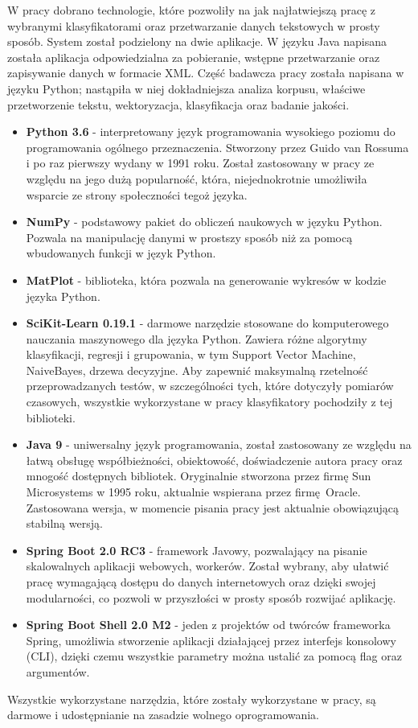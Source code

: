 W pracy dobrano technologie, które pozwoliły na jak najłatwiejszą pracę z wybranymi klasyfikatorami oraz przetwarzanie danych tekstowych w prosty sposób. System został podzielony na dwie aplikacje. W języku Java napisana została aplikacja odpowiedzialna za pobieranie, wstępne przetwarzanie oraz zapisywanie danych w formacie XML. Część badawcza pracy została napisana w języku Python; nastąpiła w niej dokładniejsza analiza korpusu, właściwe przetworzenie tekstu, wektoryzacja, klasyfikacja oraz badanie jakości. 
\begin{itemize}
\setlength\itemsep{0.6em}
\item \textbf{Python 3.6} - interpretowany język programowania wysokiego poziomu do programowania ogólnego przeznaczenia.\cite{python-reference} Stworzony przez Guido van Rossuma i po raz pierwszy wydany w 1991 roku. Został zastosowany w pracy ze względu na jego dużą popularność, która, niejednokrotnie umożliwiła wsparcie ze strony społeczności tegoż języka.
\item \textbf{NumPy} - podstawowy pakiet do obliczeń naukowych w języku Python. Pozwala na manipulację danymi w prostszy sposób niż za pomocą wbudowanych funkcji w język Python. \cite{numpy-reference}
\item \textbf{MatPlot} - biblioteka, która pozwala na generowanie wykresów w kodzie języka Python. \cite{matplot-reference}
\item \textbf{SciKit-Learn 0.19.1} - darmowe narzędzie stosowane do komputerowego nauczania maszynowego dla języka Python. Zawiera różne algorytmy klasyfikacji, regresji i grupowania, w tym Support Vector Machine, NaiveBayes, drzewa decyzyjne. Aby zapewnić maksymalną rzetelność przeprowadzanych testów, w szczególności tych, które dotyczyły pomiarów czasowych, wszystkie wykorzystane w pracy klasyfikatory pochodziły z tej biblioteki.  \cite{skl-reference}
\item \textbf{Java 9} - uniwersalny język programowania, został zastosowany ze względu na łatwą obsługę współbieżności, obiektowość, doświadczenie autora pracy oraz mnogość dostępnych bibliotek. \cite{java-reference} Oryginalnie stworzona przez firmę Sun Microsystems w 1995 roku, aktualnie wspierana przez firmę Oracle. Zastosowana wersja, w momencie pisania pracy jest aktualnie obowiązującą stabilną wersją. \cite{java9-reference}
\item \textbf{Spring Boot 2.0 RC3} - framework Javowy, pozwalający na pisanie skalowalnych aplikacji webowych, workerów. Został wybrany, aby ułatwić pracę wymagającą dostępu do danych internetowych oraz dzięki swojej modularności, co pozwoli w przyszłości w prosty sposób rozwijać aplikację. \cite{spring-boot-reference}
\item \textbf{Spring Boot Shell 2.0 M2} - jeden z projektów od twórców frameworka Spring, umożliwia stworzenie aplikacji działającej przez interfejs konsolowy (CLI), dzięki czemu wszystkie parametry można ustalić za pomocą flag oraz argumentów. \cite{spring-shell-reference}
\end{itemize}

Wszystkie wykorzystane narzędzia, które zostały wykorzystane w pracy, są darmowe i udostępnianie na zasadzie wolnego oprogramowania. 